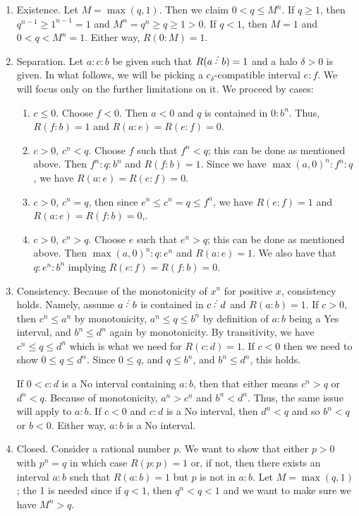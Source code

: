 \documentclass[12pt]{article}
\begin{document}
\begin{enumerate}
    \item Existence. Let $M = \max(q, 1)$. Then we claim $0 < q \leq M^n$. If $q \geq 1$, then $q^{n-1} \geq 1^{n-1} = 1$ and $M^n = q^n \geq q \geq 1 > 0$. If $ q < 1$, then $M=1$ and $0 < q < M^n = 1$. Either way, $R(0:M) = 1$. 
    \item Separation. Let $a: c: b$ be given such that $R(a \lte b)=1$ and a halo $\delta > 0$ is given. In what follows, we will be picking a $c_\delta$-compatible interval $e:f$. We will focus only on the further limitations on it.  We proceed by cases:
    \begin{enumerate}
        \item $c \leq 0$. Choose $f < 0$. Then $a<0$ and $q$ is contained in $0:b^n$. Thus, $R(f:b) = 1$ and $R(a:e) = R(e:f) = 0$. 
        \item $c>0$, $c^n <q$. Choose $f$ such that $f^n<q$; this can be done as mentioned above. Then $f^n:q:b^n$ and $R(f:b)=1$. Since we have $\max(a, 0)^n :f^n:q$, we have $R(a:e) = R(e:f) =0$. 
        \item $c>0$, $c^n = q$, then since $e^n \leq c^n =  q \leq f^n$, we have $R(e:f) =1$ and $R(a:e) = R(f:b) = 0$,.
        \item $c>0$, $c^n > q$. Choose $e$ such that $e^n > q$; this can be done as mentioned above. Then $\max(a, 0)^n:q:e^n$ and $R(a:e) = 1$. We also have that $q:e^n:b^n$ implying $R(e:f) = R(f:b) =0$.
    \end{enumerate}
    \item Consistency. Because of the monotonicity of $x^n$ for positive $x$, consistency holds. Namely, assume $a\lte b$ is contained in $c \lte d$ and $R(a:b)=1$. If $c>0$, then $c^n \leq a^n$ by monotonicity,  $a^n \leq q \leq b^n$ by definition of $a:b$ being a Yes interval, and $b^n \leq d^n$ again by monotonicity. By transitivity, we have $c^n \leq q \leq d^n$ which is what we need for $R(c:d) = 1$.  If $c<0$ then we need to show $0 \leq q \leq d^n$. Since $0 \leq q$, and $q \leq  b^n$, and $b^n \leq d^n$, this holds. 

    If $0 < c:d$ is a No interval containing $a:b$, then that either means $c^n > q$ or $d^n < q$. Because of monotonicity, $a^n >c^n$ and $b^n < d^n$. Thus, the same issue will apply to $a:b$. If $c < 0$ and $c:d$ is a No interval, then $d^n < q$ and so $b^n < q$ or $b < 0$. Either way, $a:b$ is a No interval. 
    
    \item Closed. Consider a rational number $p$. We want to show that either $p>0$ with $p^n = q$ in which case $R(p:p)=1$ or, if not, then there exists an interval $a:b$ such that $R(a:b)=1$ but $p$ is not in $a:b$. Let $M = \max(q, 1)$; the 1 is needed since if $q<1$, then $q^n < q < 1$ and we want to make sure we have $M^n > q$.
    

\end{enumerate}
\end{document}
